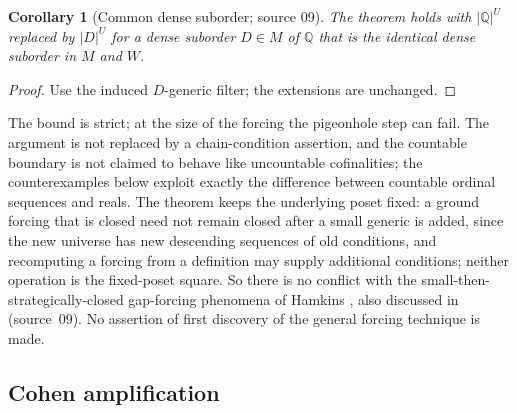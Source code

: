 \documentclass[11pt,letterpaper]{article}
\numberwithin{equation}{section}
\newtheorem{corollary}[corollary]{Corollary}
\theoremstyle{definition}
\theoremstyle{remark}
\newcommand{\abs}[1]{\lvert#1\rvert}
\begin{document}
\begin{corollary}[Common dense suborder; source 09]\label{univ:gs:cor:densesub}
The theorem holds with $\abs{\mathbb Q}^U$ replaced by $\abs D^U$ for a dense suborder $D\in M$
of $\mathbb Q$ that is the identical dense suborder in $M$ and $W$.
\end{corollary}
\begin{proof}
Use the induced $D$-generic filter; the extensions are unchanged.
\end{proof}

The bound is strict; at the size of the forcing the pigeonhole step can fail. The argument is
not replaced by a chain-condition assertion, and the countable boundary is not claimed to
behave like uncountable cofinalities; the counterexamples below exploit exactly the difference
between countable ordinal sequences and reals. The theorem keeps the underlying poset fixed: a
ground forcing that is closed need not remain closed after a small generic is added, since the
new universe has new descending sequences of old conditions, and recomputing a forcing from a
definition may supply additional conditions; neither operation is the fixed-poset square. So
there is no conflict with the small-then-strategically-closed gap-forcing phenomena of Hamkins
\cite{Hamkins}, also discussed in \cite[Section~2]{FKW} (source~09). No assertion of first
discovery of the general forcing technique is made.

\subsection{Cohen amplification}
\end{document}
